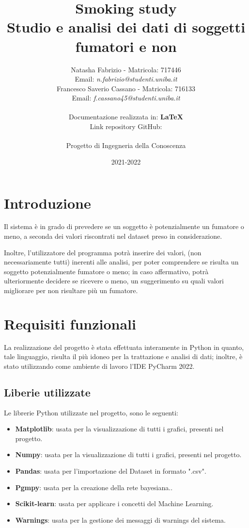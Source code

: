 \documentclass{article}
\title{\textbf{Smoking study} \\
    \large Studio e analisi dei dati di soggetti fumatori e non}\\\\
\author{Natasha Fabrizio - Matricola: 717446 \\
Email: \textit{n.fabrizio@studenti.uniba.it} \\
    Francesco Saverio Cassano - Matricola: 716133 \\
Email: \textit{f.cassano45@studenti.uniba.it} \\\\
Documentazione realizzata in: \textbf{LaTeX} \\
Link repository GitHub: \textit{}\\\\
    Progetto di Ingegneria della Conoscenza}
\date{2021-2022}
\begin{document}
    \maketitle

    \newpage

    \tableofcontents{}

    \newpage

\section{Introduzione}

Il sistema è in grado di prevedere se un soggetto è potenzialmente un fumatore o meno, a seconda dei valori riscontrati nel dataset preso in considerazione. 
%

\noindent
Inoltre, l'utilizzatore del programma potrà inserire dei valori, (non necessariamente tutti) inerenti alle analisi, per poter comprendere se risulta un soggetto potenzialmente fumatore o meno; in caso affermativo, potrà ulteriormente decidere se ricevere o meno, un suggerimento su quali valori migliorare per non risultare più un fumatore.

\section{Requisiti funzionali}

La realizzazione del progetto è stata effettuata interamente in Python in quanto, tale linguaggio, risulta il più idoneo per la trattazione e analisi di dati; inoltre, è stato utilizzando come ambiente di lavoro l'IDE PyCharm 2022.

\subsection{Liberie utilizzate}
Le librerie Python utilizzate nel progetto, sono le seguenti:
\begin{itemize}
    \item \textbf{Matplotlib}: usata per la visualizzazione di tutti i grafici, presenti nel progetto.
    \item \textbf{Numpy}: usata per la visualizzazione di tutti i grafici, presenti nel progetto.
    \item \textbf{Pandas}: usata per l’importazione del  Dataset in formato ".csv".
    \item \textbf{Pgmpy}: usata per la creazione della rete bayesiana..
    \item\textbf{Scikit-learn}: usata per applicare i concetti del Machine Learning.
    \item \textbf{Warnings}: usata per la gestione dei messaggi  di warnings del sistema.
\end{itemize} 
\end{document}
